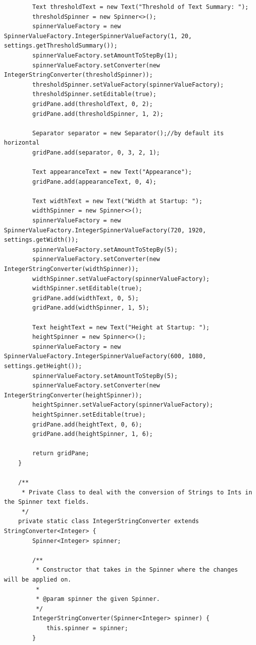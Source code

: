 \begin{lstlisting}
        Text thresholdText = new Text("Threshold of Text Summary: ");
        thresholdSpinner = new Spinner<>();
        spinnerValueFactory = new SpinnerValueFactory.IntegerSpinnerValueFactory(1, 20, settings.getThresholdSummary());
        spinnerValueFactory.setAmountToStepBy(1);
        spinnerValueFactory.setConverter(new IntegerStringConverter(thresholdSpinner));
        thresholdSpinner.setValueFactory(spinnerValueFactory);
        thresholdSpinner.setEditable(true);
        gridPane.add(thresholdText, 0, 2);
        gridPane.add(thresholdSpinner, 1, 2);

        Separator separator = new Separator();//by default its horizontal
        gridPane.add(separator, 0, 3, 2, 1);

        Text appearanceText = new Text("Appearance");
        gridPane.add(appearanceText, 0, 4);

        Text widthText = new Text("Width at Startup: ");
        widthSpinner = new Spinner<>();
        spinnerValueFactory = new SpinnerValueFactory.IntegerSpinnerValueFactory(720, 1920, settings.getWidth());
        spinnerValueFactory.setAmountToStepBy(5);
        spinnerValueFactory.setConverter(new IntegerStringConverter(widthSpinner));
        widthSpinner.setValueFactory(spinnerValueFactory);
        widthSpinner.setEditable(true);
        gridPane.add(widthText, 0, 5);
        gridPane.add(widthSpinner, 1, 5);

        Text heightText = new Text("Height at Startup: ");
        heightSpinner = new Spinner<>();
        spinnerValueFactory = new SpinnerValueFactory.IntegerSpinnerValueFactory(600, 1080, settings.getHeight());
        spinnerValueFactory.setAmountToStepBy(5);
        spinnerValueFactory.setConverter(new IntegerStringConverter(heightSpinner));
        heightSpinner.setValueFactory(spinnerValueFactory);
        heightSpinner.setEditable(true);
        gridPane.add(heightText, 0, 6);
        gridPane.add(heightSpinner, 1, 6);

        return gridPane;
    }

    /**
     * Private Class to deal with the conversion of Strings to Ints in the Spinner text fields.
     */
    private static class IntegerStringConverter extends StringConverter<Integer> {
        Spinner<Integer> spinner;

        /**
         * Constructor that takes in the Spinner where the changes will be applied on.
         *
         * @param spinner the given Spinner.
         */
        IntegerStringConverter(Spinner<Integer> spinner) {
            this.spinner = spinner;
        }


\end{lstlisting}
